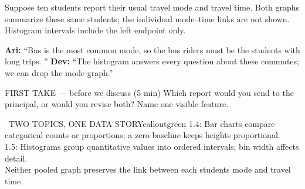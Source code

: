 \documentclass[11pt]{article}
\begin{document}


Suppose ten students report their usual travel mode and travel time. Both graphs summarize these same students; the individual mode--time links are not shown. Histogram intervals include the left endpoint only.\par\smallskip \textbf{Ari:} ``Bus is the most common mode, so the bus riders must be the students with long trips. '' \textbf{Dev:} ``The histogram answers every question about these commutes; we can drop the mode graph.''\par
\begin{center}
\par\smallskip
{}
\end{center}
\begin{firsttakebox}{FIRST TAKE --- before we discuss (5 min)}
Which report would you send to the principal, or would you revise both? Name one visible feature.
\workspace{0.8in}
\end{firsttakebox}

\begin{callout}{\IconBook\ TWO TOPICS, ONE DATA STORY}{calloutgreen}
1.4: Bar charts compare categorical counts or proportions; a zero baseline keeps heights proportional.\\ 1.5: Histograms group quantitative values into ordered intervals; bin width affects detail.\\ Neither pooled graph preserves the link between each student\textquotesingle s mode and travel time.
\end{callout}
\end{document}
